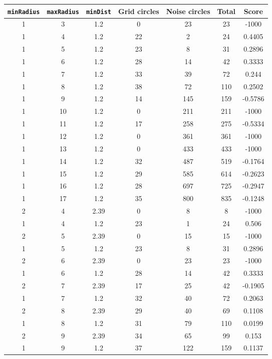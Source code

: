 \documentclass[letterpaper, 12pt]{article}
\begin{document}
\begin{longtable}{|c|c|c|c|c|c|c|}
\hline
\textbf{\texttt{minRadius}} & \textbf{\texttt{maxRadius}} & \textbf{\texttt{minDist}} & \textbf{Grid circles} & \textbf{Noise circles} & \textbf{Total} & \textbf{Score} \\
\hline
1 & 3 & 1.2 & 0 & 23 & 23 & -1000 \\
\hline
1 & 4 & 1.2 & 22 & 2 & 24 & 0.4405 \\
\hline
1 & 5 & 1.2 & 23 & 8 & 31 & 0.2896 \\
\hline
1 & 6 & 1.2 & 28 & 14 & 42 & 0.3333 \\
\hline
1 & 7 & 1.2 & 33 & 39 & 72 & 0.244 \\
\hline
1 & 8 & 1.2 & 38 & 72 & 110 & 0.2502 \\
\hline
1 & 9 & 1.2 & 14 & 145 & 159 & -0.5786 \\
\hline
1 & 10 & 1.2 & 0 & 211 & 211 & -1000 \\
\hline
1 & 11 & 1.2 & 17 & 258 & 275 & -0.5334 \\
\hline
1 & 12 & 1.2 & 0 & 361 & 361 & -1000 \\
\hline
1 & 13 & 1.2 & 0 & 433 & 433 & -1000 \\
\hline
1 & 14 & 1.2 & 32 & 487 & 519 & -0.1764 \\
\hline
1 & 15 & 1.2 & 29 & 585 & 614 & -0.2623 \\
\hline
1 & 16 & 1.2 & 28 & 697 & 725 & -0.2947 \\
\hline
1 & 17 & 1.2 & 35 & 800 & 835 & -0.1248 \\
\hline
2 & 4 & 2.39 & 0 & 8 & 8 & -1000 \\
\hline
1 & 4 & 1.2 & 23 & 1 & 24 & 0.506 \\
\hline
2 & 5 & 2.39 & 0 & 15 & 15 & -1000 \\
\hline
1 & 5 & 1.2 & 23 & 8 & 31 & 0.2896 \\
\hline
2 & 6 & 2.39 & 0 & 23 & 23 & -1000 \\
\hline
1 & 6 & 1.2 & 28 & 14 & 42 & 0.3333 \\
\hline
2 & 7 & 2.39 & 17 & 25 & 42 & -0.1905 \\
\hline
1 & 7 & 1.2 & 32 & 40 & 72 & 0.2063 \\
\hline
2 & 8 & 2.39 & 29 & 40 & 69 & 0.1108 \\
\hline
1 & 8 & 1.2 & 31 & 79 & 110 & 0.0199 \\
\hline
2 & 9 & 2.39 & 34 & 65 & 99 & 0.153 \\
\hline
1 & 9 & 1.2 & 37 & 122 & 159 & 0.1137 \\

\end{longtable}
\end{document}
